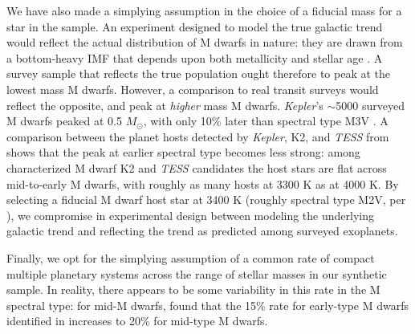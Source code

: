 \documentclass[twocolumn]{aastex631}
\begin{document}
We have also made a simplying assumption in the choice of a fiducial mass for a star in the sample. An experiment designed to model the true galactic trend would reflect the actual distribution of M dwarfs in nature: they are drawn from a bottom-heavy IMF that depends upon both metallicity and stellar age \citep{li_stellar_2023}. A survey sample that reflects the true population ought therefore to peak at the lowest mass M dwarfs. However, a comparison to real transit surveys would reflect the opposite, and peak at \textit{higher} mass M dwarfs. \textit{Kepler}'s $\sim$5000 surveyed M dwarfs \citep{Brown11, Dressing13, Dressing15} peaked at 0.5 $M_{\odot}$, with only 10\% later than spectral type M3V \citep{Muirhead15, Hardegree19}. A comparison between the planet hosts detected by \textit{Kepler}, K2, and \textit{TESS} from \cite{berger_gaia-kepler-tess-host_2023} shows that the peak at earlier spectral type becomes less strong: among characterized M dwarf K2 and \textit{TESS} candidates the host stars are flat across mid-to-early M dwarfs, with roughly as many hosts at 3300 K as at 4000 K. By selecting a fiducial M dwarf host star at 3400 K (roughly spectral type M2V, per \citealt{Boyajian12}), we compromise in experimental design between modeling the underlying galactic trend and reflecting the trend as predicted among surveyed exoplanets. 

Finally, we opt for the simplying assumption of a common rate of compact multiple planetary systems across the range of stellar masses in our synthetic sample. In reality, there appears to be some variability in this rate in the M spectral type: for mid-M dwarfs, \cite{Muirhead15} found that the 15\% rate for early-type M dwarfs identified in \citep{Ballard16} increases to 20\% for mid-type M dwarfs.
\end{document}
